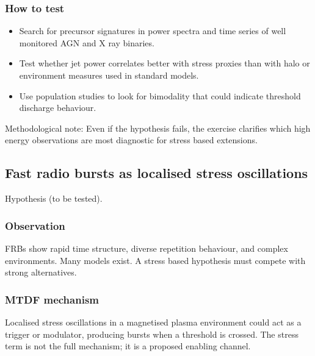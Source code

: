 \documentclass[11pt,a4paper]{article}
\begin{document}
\subsubsection{How to test}
\begin{itemize}
  \item Search for precursor signatures in power spectra and time series of well monitored AGN and X ray binaries.
  \item Test whether jet power correlates better with stress proxies than with halo or environment measures used in standard models.
  \item Use population studies to look for bimodality that could indicate threshold discharge behaviour.
\end{itemize}

\begin{mdframed}[linecolor=accent,linewidth=0.5pt,backgroundcolor=callout-bg,leftline=true,rightline=true,topline=true,bottomline=true,innerleftmargin=8pt,innerrightmargin=8pt,innertopmargin=6pt,innerbottommargin=6pt]
Methodological note: Even if the hypothesis fails, the exercise clarifies which high energy observations are most diagnostic for stress based extensions.
\end{mdframed}

\subsection{Fast radio bursts as localised stress oscillations}
\begin{mdframed}[linecolor=accent,linewidth=0.5pt,backgroundcolor=callout-bg,leftline=true,rightline=true,topline=true,bottomline=true,innerleftmargin=8pt,innerrightmargin=8pt,innertopmargin=6pt,innerbottommargin=6pt]
Hypothesis (to be tested).
\end{mdframed}

\subsubsection{Observation}
FRBs show rapid time structure, diverse repetition behaviour, and complex environments. Many models exist. A stress based hypothesis must compete with strong alternatives.

\subsubsection{MTDF mechanism}
Localised stress oscillations in a magnetised plasma environment could act as a trigger or modulator, producing bursts when a threshold is crossed. The stress term is not the full mechanism; it is a proposed enabling channel.
\end{document}
